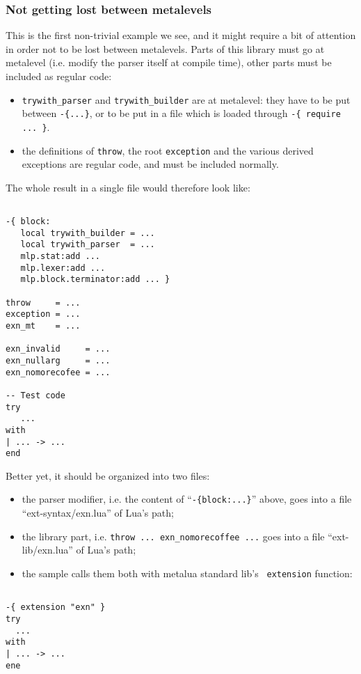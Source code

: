 \subsubsection{Not getting lost between metalevels}
This is the first non-trivial example we see, and it might require a
bit of attention in order not to be lost between metalevels. Parts of
this library must go at metalevel (i.e. modify the parser itself at
compile time), other parts must be included as regular code:
\begin{itemize}
\item {\tt trywith\_parser} and {\tt trywith\_builder} are at metalevel:
  they have to be put between \verb|-{...}|, or to be put in a file
  which is loaded through \verb|-{ require ... }|. 
\item the definitions of {\tt throw}, the root {\tt exception} and the
  various derived exceptions are regular code, and must be included normally.
\end{itemize}

The whole result in a single file would therefore look like:

\begin{Verbatim}[fontsize=\scriptsize]

-{ block:
   local trywith_builder = ...
   local trywith_parser  = ...
   mlp.stat:add ...
   mlp.lexer:add ...
   mlp.block.terminator:add ... }

throw     = ...
exception = ...
exn_mt    = ...

exn_invalid     = ...
exn_nullarg     = ...
exn_nomorecofee = ...

-- Test code
try
   ...
with
| ... -> ...
end
\end{Verbatim}

Better yet, it should be organized into two files:
\begin{itemize}
\item the parser modifier, i.e. the content of ``{\tt-\{block:...\}}''
  above, goes into a file ``ext-syntax/exn.lua'' of Lua's path;
\item the library part, i.e. {\tt throw ... exn\_nomorecoffee ...}
  goes into a file ``ext-lib/exn.lua'' of Lua's path;
\item the sample calls them both with metalua standard lib's {\tt
extension} function:
\end{itemize}

\begin{Verbatim}[fontsize=\scriptsize]

-{ extension "exn" }
try
  ...
with
| ... -> ...
ene
\end{Verbatim}

